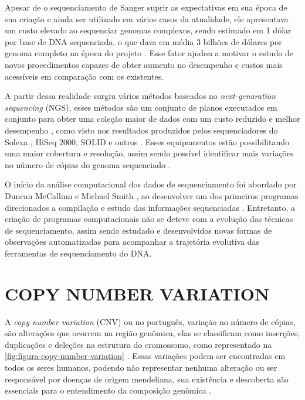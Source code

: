 Apesar de o sequenciamento de Sanger suprir as expectativas em sua época de sua criação e ainda ser utilizado em vários casos da atualidade, ele apresentava um custo elevado ao sequenciar genomas complexos, sendo estimado em 1 dólar por base de DNA sequenciada, o que dava em média 3 bilhões de dólares por genoma completo na época do projeto \cite{HutchisonIII2007}. Esse fator ajudou a motivar o estudo de novos procedimentos capazes de obter aumento no desempenho e custos mais acessíveis em comparação com os existentes.

A partir dessa realidade surgiu vários métodos baseados no \textit{next-genaration sequencing} (NGS), esses métodos são um conjunto de planos executados em conjunto para obter uma coleção maior de dados com um custo reduzido e melhor desempenho \cite{Metzker2010,Zhao2013}, como visto nos resultados produzidos pelos sequenciadores do Solexa \cite{Bennett2004}, HiSeq 2000, SOLID e outros \cite{Edwards2011,Linnarsson2010}. Esses equipamentos estão possibilitando uma maior cobertura e resolução, assim sendo possível identificar mais variações no número de cópias do genoma sequenciado \cite{Zhao2013}.


O início da análise computacional dos dados de sequenciamento foi abordado por Duncan McCallum e Michael Smith \cite{McCallum1977}, ao desenvolver um dos primeiros programas direcionados a compilação e estudo das informações sequenciadas \cite{HutchisonIII2007}. Entretanto, a criação de programas computacionais não se deteve com a evolução das técnicas de sequenciamento, assim sendo estudado e desenvolvidos novas formas de observações automatizadas para acompanhar a trajetória evolutiva das ferramentas de sequenciamento do DNA.


\section{COPY NUMBER VARIATION} 
\label{sec:copyNumberVariation}

A \textit{copy number variation} (CNV) ou no português, variação no número de cópias, são alterações que ocorrem na região genômica, elas se classificam como inserções, duplicações e deleções na estrutura do cromossomo, como representado na \autoref{fig:figura-copy-number-variation} \cite{Zhao2013,Redon2006}. Essas variações podem ser encontradas em todos os seres humanos, podendo não representar nenhuma alteração ou ser responsável por doenças de origem mendeliana, sua existência e descoberta são essenciais para o entendimento da composição genômica \cite{Redon2006,Feuk2006}.

